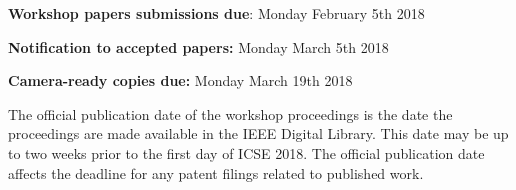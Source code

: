 \documentclass[10pt, conference]{IEEEtran}
\begin{document}
\textbf{Workshop papers submissions due}: Monday February 5th 2018

\textbf{Notification to accepted papers:} Monday March 5th 2018

\textbf{Camera-ready copies due:} Monday March 19th 2018

\vspace{0.2cm}

The official publication date of the workshop proceedings is the date the proceedings are made available in the IEEE Digital Library. This date may be up to two weeks prior to the first day of ICSE 2018. The official publication date affects the deadline for any patent filings related to published work.
\end{document}
